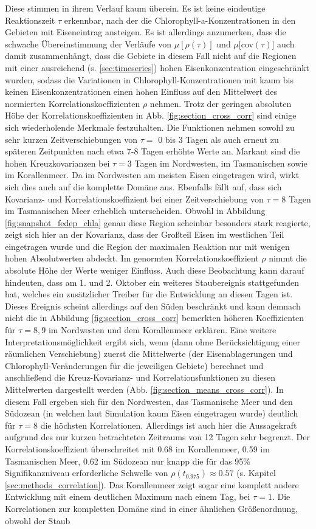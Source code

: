 \documentclass[12pt,a4paper,onecolumn]{scrartcl}
\begin{document}
Diese stimmen in ihrem Verlauf kaum überein. Es ist keine eindeutige Reaktionszeit $\tau$ erkennbar, nach der die Chlorophyll-a-Konzentrationen in den Gebieten mit Eiseneintrag ansteigen. Es ist allerdings anzumerken, dass die schwache Übereinstimmung der Verläufe von $\mu[\rho(\tau)]$ und $\mu[$cov$(\tau)]$ auch damit zusammenhängt, dass die Gebiete in diesem Fall nicht auf die Regionen mit einer ausreichend (s. \ref{sec:timeseries}) hohen Eisenkonzentration eingeschränkt wurden, sodass die Variationen in Chlorophyll-Konzentrationen mit kaum bis keinen Eisenkonzentrationen einen hohen Einfluss auf den Mittelwert des normierten Korrelationskoeffizienten $\rho$ nehmen. Trotz der geringen absoluten Höhe der Korrelationskoeffizienten in Abb. \ref{fig:section_cross_corr} sind einige sich wiederholende Merkmale festzuhalten. Die Funktionen nehmen sowohl zu sehr kurzen Zeitverschiebungen von $\tau=$ 0 bis 3 Tagen als auch erneut zu späteren Zeitpunkten nach etwa 7-8 Tagen erhöhte Werte an. Markant sind die hohen Kreuzkovarianzen bei $\tau=3$ Tagen im Nordwesten, im Tasmanischen sowie im Korallenmeer. Da im Nordwesten am meisten Eisen eingetragen wird, wirkt sich dies auch auf die komplette Domäne aus. Ebenfalls fällt auf, dass sich Kovarianz- und Korrelationskoeffizient bei einer Zeitverschiebung von $\tau=8$ Tagen im Tasmanischen Meer erheblich unterscheiden. Obwohl in Abbildung \ref{fig:snapshot_fedep_chla} genau diese Region scheinbar besonders stark reagierte, zeigt sich hier an der Kovarianz, dass der Großteil Eisen im westlichen Teil eingetragen wurde und die Region der maximalen Reaktion nur mit wenigen hohen Absolutwerten abdeckt. Im genormten Korrelationskoeffizient $\rho$ nimmt die absolute Höhe der Werte weniger Einfluss. Auch diese Beobachtung kann darauf hindeuten, dass am 1. und 2. Oktober ein weiteres Staubereignis stattgefunden hat, welches ein zusätzlicher Treiber für die Entwicklung an diesen Tagen ist. Dieses Ereignis scheint allerdings auf den Süden beschränkt und kann demnach nicht die in Abbildung \ref{fig:section_cross_corr} bemerkten höheren Koeffizienten für $\tau=8,9$ im Nordwesten und dem Korallenmeer erklären. Eine weitere Interpretationsmöglichkeit ergibt sich, wenn (dann ohne Berücksichtigung einer räumlichen Verschiebung) zuerst die Mittelwerte (der Eisenablagerungen und Chlorophyll-Veränderungen für die jeweiligen Gebiete) berechnet und anschließend die Kreuz-Kovarianz- und Korrelationsfunktionen zu diesen Mittelwerten dargestellt werden (Abb. \ref{fig:section_means_cross_corr}). In diesem Fall ergeben sich für den Nordwesten, das Tasmanische Meer und den Südozean (in welchen laut Simulation kaum Eisen eingetragen wurde) deutlich für $\tau=8$ die höchsten Korrelationen. Allerdings ist auch hier die Aussagekraft aufgrund des nur kurzen betrachteten Zeitraums von 12 Tagen sehr begrenzt. Der Korrelationskoeffizient überschreitet mit 0.68 im Korallenmeer, 0.59 im Tasmanischen Meer, 0.62 im Südozean nur knapp die für das 95\% Signifikanzniveau erforderliche Schwelle von $\rho(t_{0.975})\approx0.57$ (s. Kapitel \ref{sec:methods_correlation}). Das Korallenmeer zeigt sogar eine komplett andere Entwicklung mit einem deutlichen Maximum nach einem Tag, bei $\tau=1$. Die Korrelationen zur kompletten Domäne sind in einer ähnlichen Größenordnung, obwohl der Staub 
\end{document}
